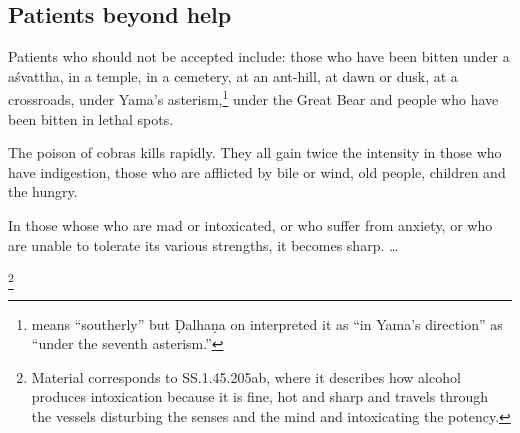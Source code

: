 \begin{translation}[resume]
 \subsection{Patients beyond help}  
 
 \item[38] 

Patients who should not be accepted include: those who have been
bitten under a \gls{aśvattha}, in a temple, in a cemetery, at an
ant-hill, at dawn or dusk, at a crossroads, under Yama's
asterism,\footnote{ means “southerly” but Ḍalhaṇa on
     interpreted it as “in
    Yama's direction” as “under the seventh asterism.”} under the Great
    Bear and people who have been bitten in lethal spots.
 
 \item[39]  
 
The poison of cobras kills rapidly.  They all gain twice the intensity
in those who have indigestion, those who are afflicted by bile or
wind, old people, children and the hungry.
 
 
 \item[39.1]  
 
In those whose who are mad or intoxicated, or who suffer from anxiety,
or who are unable to tolerate its various strengths, it becomes sharp.
\dag \ldots
 
 \item[39.2] 
 
 
 
 \footnote{Material corresponds to SS.1.45.205ab, where it  
 describes how alcohol produces intoxication because it is fine, hot  
 and sharp and travels through the vessels disturbing the senses and  
 the mind and intoxicating the potency.}  
 
 \item [3.40cd--3.43ab]  
 

\end{translation}
